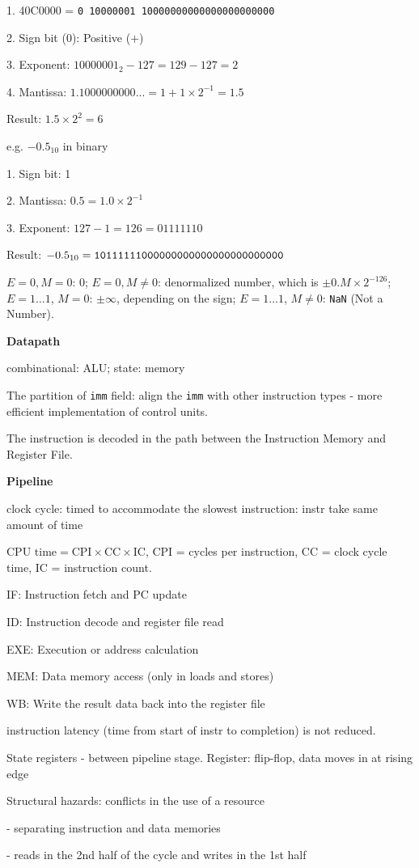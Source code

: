 \documentclass[10pt,landscape,a4paper]{article}
\begin{document}
\begin{multicols}{3}
1. 40C0000 = \verb|0 10000001 10000000000000000000000|
  
2. Sign bit (0): Positive (\(+\))

3. Exponent: \(10000001_2 - 127 = 129 - 127 = 2\)

4. Mantissa: \(1.1000000000... = 1 + 1 \times 2^{-1} = 1.5\)

Result: \(1.5 \times 2^2 =6\)

e.g. \(-0.5_{10}\) in binary 

1. Sign bit: 1 
  
2. Mantissa: \(0.5 = 1.0 \times 2^{-1}\)  
  
3. Exponent: \(127 - 1 = 126 = 0111 1110\)

Result: \(-0.5_{10} = \verb|10111111000000000000000000000000|\)

\(E = 0, M = 0\): 0; \(E = 0, M \neq 0\): denormalized number, which is \(\pm 0.M \times 2^{-126}\); \(E = 1\ldots 1\), \(M = 0\): \(\pm \infty\), depending on the sign; \(E = 1\ldots 1\), \(M \neq 0\): \verb|NaN| (Not a Number).

\textbf{Datapath}

combinational: ALU; state: memory

The partition of \verb|imm| field: align the \verb|imm| with other instruction types - more efficient implementation of control units.

The instruction is decoded in the path between the Instruction Memory and Register File.

\textbf{Pipeline}

clock cycle: timed to accommodate the slowest instruction: instr take same amount of time

\(\text{CPU time} = \text{CPI} \times \text{CC} \times \text{IC}\), CPI = cycles per instruction, CC = clock cycle time, IC = instruction count.

IF: Instruction fetch and PC update

ID: Instruction decode and register file read

EXE: Execution or address calculation

MEM: Data memory access (only in loads and stores)

WB: Write the result data back into the register file

instruction latency (time from start of instr to completion) is not reduced.

State registers - between pipeline stage. Register: flip-flop, data moves in at rising edge 

Structural hazards: conflicts in the use of a resource

- separating instruction and data memories

- reads in the 2nd half of the cycle and writes in the 1st half
\vfill\break
\end{multicols}
\end{document}
